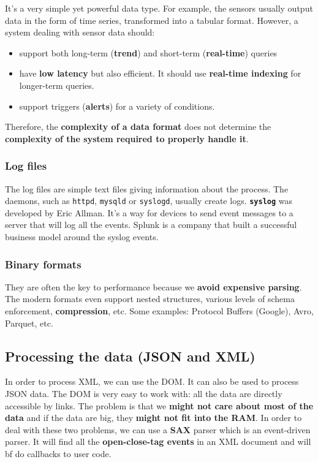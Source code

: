 It's a very simple yet powerful data type. For example, the sensors usually output data in the form of time series, transformed into a tabular format. However, a system dealing with sensor data should:
\begin{itemize}
 \item support both long-term ({\bf trend}) and short-term ({\bf real-time}) queries
 \item have {\bf low latency} but also efficient. It should use {\bf real-time indexing} for longer-term queries.
 \item support triggers ({\bf alerts}) for a variety of conditions.
\end{itemize}
Therefore, the {\bf complexity of a data format} does not determine the {\bf complexity of the system required to properly handle it}.

\subsubsection{Log files}

The log files are simple text files giving information about the process. The daemons, such as \verb+httpd+, \verb+mysqld+ or \verb+syslogd+, usually create logs. {\bf \verb+syslog+} was developed by Eric Allman. It's a way for devices to send event messages to a server that will log all the events. Splunk is a company that built a successful business model around the syslog events.

\subsubsection{Binary formats}

They are often the key to performance because we {\bf avoid expensive parsing}. The modern formats even support nested structures, various levels of schema enforcement, {\bf compression}, etc. Some examples: Protocol Buffers (Google), Avro, Parquet, etc.

\subsection{Processing the data (JSON and XML)}

In order to process XML, we can use the DOM. It can also be used to process JSON data. The DOM is very easy to work with: all the data are directly accessible by links. The problem is that we {\bf might not care about most of the data} and if the data are big, they {\bf might not fit into the RAM}. In order to deal with these two problems, we can use a {\bf SAX} parser which is an event-driven parser. It will find all the {\bf open-close-tag events} in an XML document and will {bf do callbacks to user code}.


